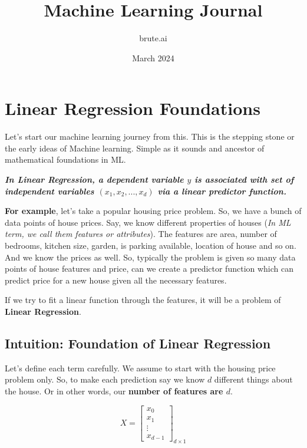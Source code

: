 \documentclass[11pt,fleqn]{book}
\title{Machine Learning Journal}
\author{brute.ai}
\date{March 2024}
\begin{document}
\maketitle
\tableofcontents

\chapter{Linear Regression Foundations}

Let's start our machine learning journey from this. This is the stepping stone or the early ideas of Machine learning. Simple as it sounds and ancestor of mathematical foundations in ML.

\begin{center}
    \textit{\textbf{In Linear Regression, a dependent variable $y$ is associated with set of independent variables $(x_1, x_2, ..., x_d)$ via a linear predictor function.}}
\end{center}

\textbf{For example}, let's take a popular housing price problem. So, we have a bunch of data points of house prices. Say, we know different properties of houses (\textit{In ML term, we call them features or attributes}). The features are area, number of bedrooms, kitchen size, garden, is parking available, location of house and so on. And we know the prices as well. So, typically the problem is given so many data points of house features and price, can we create a predictor function which can predict price for a new house given all the necessary features.

If we try to fit a linear function through the features, it will be a problem of \textbf{Linear Regression}.

\section{Intuition: Foundation of Linear Regression}

Let's define each term carefully. We assume to start with the housing price problem only. So, to make each prediction say we know $d$ different things about the house. Or in other words, our \textbf{number of features are $d$}.

\[X = \begin{bmatrix}
x_0 \\
x_1 \\
\vdots \\
x_{d-1}
\end{bmatrix}_{d \times 1}\]
\end{document}
